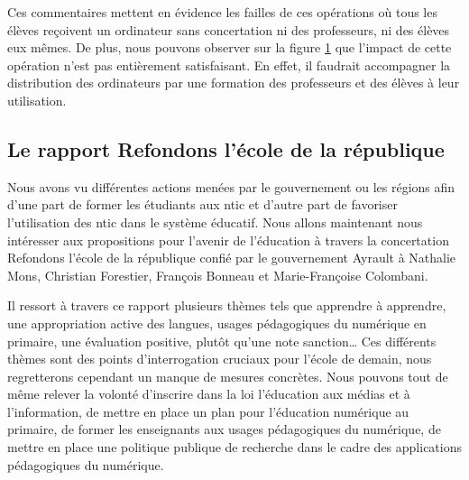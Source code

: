 Ces commentaires mettent en évidence les failles de ces opérations où tous les élèves reçoivent un ordinateur sans concertation ni des professeurs, ni des élèves eux mêmes. De plus, nous pouvons observer sur la figure \ref{graph_op_portables} que l'impact de cette opération n'est pas entièrement satisfaisant. En effet, il faudrait accompagner la distribution des ordinateurs par une formation des professeurs et des élèves à leur utilisation.
\begin{figure}[H]
	\begin{center}
	\label{graph_op_portables}
	\end{center}
\end{figure}


\subsection{Le rapport \og{}Refondons l'école de la république\fg{}}

Nous avons vu différentes actions menées par le gouvernement ou les régions afin d'une part de former les étudiants aux \gls{ntic} et d'autre part de favoriser l'utilisation des \gls{ntic} dans le système éducatif. Nous allons maintenant nous intéresser aux propositions pour l'avenir de l'éducation à travers la concertation \og{}Refondons l'école de la république\fg{} confié par le gouvernement Ayrault à Nathalie Mons, Christian Forestier, François Bonneau et Marie-Françoise Colombani. 

Il ressort à travers ce rapport plusieurs thèmes tels que \og{}apprendre à apprendre\fg{}, \og{}une appropriation active des langues\fg{}, \og{}usages pédagogiques du numérique en primaire\fg{}, \og{}une évaluation positive, plutôt qu'une note sanction\fg{}… Ces différents thèmes sont des points d'interrogation cruciaux pour l'école de demain, nous regretterons cependant un manque de mesures concrètes. Nous pouvons tout de même relever la volonté d'inscrire dans la loi \og l'éducation aux médias et à l'information\fg{}, de mettre en place un plan pour l'éducation numérique au primaire, de former les enseignants aux usages pédagogiques du numérique, de mettre en place une politique publique de recherche dans le cadre des applications pédagogiques du numérique.

